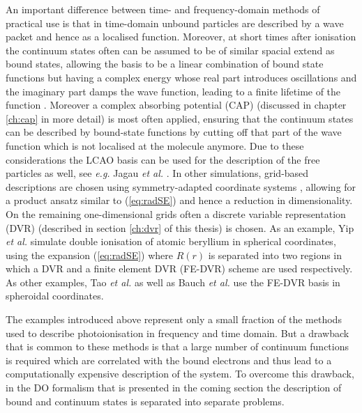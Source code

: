 An important difference between time- and frequency-domain methods of practical use is that in time-domain unbound particles are described by a wave packet and hence as a localised function.
Moreover, at short times after ionisation the continuum states often can be assumed to be of similar spacial extend as bound states, allowing the basis to be a linear combination of bound state functions but having a complex energy whose real part introduces oscillations and the imaginary part damps the wave function, leading to a finite lifetime of the function \cite{CAPccEOM}.
Moreover a complex absorbing potential (CAP) (discussed in chapter \ref{ch:cap} in more detail) is most often applied, ensuring that the continuum states can be described by bound-state functions by cutting off that part of the wave function which is not localised at the molecule anymore.
Due to these considerations the LCAO basis can be used for the description of the free particles as well, see \textit{e.g.} Jagau \textit{et al.} \cite{CAPccEOM}.
In other simulations, grid-based descriptions are chosen using symmetry-adapted coordinate systems \cite{radau,jacobi, hyperspheric,taoDVR}, allowing for a product ansatz similar to (\ref{eq:radSE}) and hence a reduction in dimensionality.
On the remaining one-dimensional grids often a discrete variable representation (DVR) (described in section \ref{ch:dvr} of this thesis) is chosen.
As an example, Yip \textit{et al.} \cite{yipDVR} simulate double ionisation of atomic beryllium in spherical coordinates, using the expansion (\ref{eq:radSE}) where $R(r)$ is separated into two regions in which a DVR and a finite element DVR (FE-DVR) scheme are used respectively.
As other examples, Tao \textit{et al.} \cite{taoDVR} as well as Bauch \textit{et al.} \cite{bauch1, bauch2} use the FE-DVR basis in spheroidal coordinates.

The examples introduced above represent only a small fraction of the methods used to describe photoionisation in frequency and time domain.
But a drawback that is common to these methods is that a large number of continuum functions is required which are correlated with the bound electrons and thus lead to a computationally expensive description of the system.
To overcome this drawback, in the DO formalism that is presented in the coming section the description of bound and continuum states is separated into separate problems.

